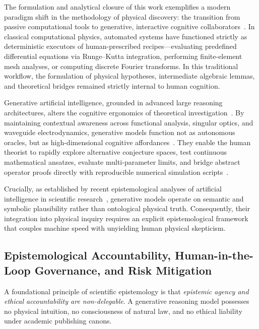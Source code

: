 \documentclass{optica-article}
\begin{document}
The formulation and analytical closure of this work exemplifies a modern paradigm shift in the methodology of physical discovery: the transition from passive computational tools to generative, interactive cognitive collaborators~\cite{OToole2024,VillaescusaNavarro2026}. In classical computational physics, automated systems have functioned strictly as deterministic executors of human-prescribed recipes---evaluating predefined differential equations via Runge--Kutta integration, performing finite-element mesh analyses, or computing discrete Fourier transforms. In this traditional workflow, the formulation of physical hypotheses, intermediate algebraic lemmas, and theoretical bridges remained strictly internal to human cognition.

Generative artificial intelligence, grounded in advanced large reasoning architectures, alters the cognitive ergonomics of theoretical investigation~\cite{OToole2024,Haber2025,Jauhiainen2026}. By maintaining contextual awareness across functional analysis, singular optics, and waveguide electrodynamics, generative models function not as autonomous oracles, but as high-dimensional cognitive affordances~\cite{OToole2024,VillaescusaNavarro2026}. They enable the human theorist to rapidly explore alternative conjecture spaces, test continuous mathematical ansatzes, evaluate multi-parameter limits, and bridge abstract operator proofs directly with reproducible numerical simulation scripts~\cite{Zhu2026PaperBanana}.

Crucially, as established by recent epistemological analyses of artificial intelligence in scientific research~\cite{Haber2025,Jauhiainen2026}, generative models operate on semantic and symbolic plausibility rather than ontological physical truth. Consequently, their integration into physical inquiry requires an explicit epistemological framework that couples machine speed with unyielding human physical skepticism.

\subsection{Epistemological Accountability, Human-in-the-Loop Governance, and Risk Mitigation}
\label{subsec:epistemic_accountability}

A foundational principle of scientific epistemology is that \emph{epistemic agency and ethical accountability are non-delegable}. A generative reasoning model possesses no physical intuition, no consciousness of natural law, and no ethical liability under academic publishing canons.
\end{document}
